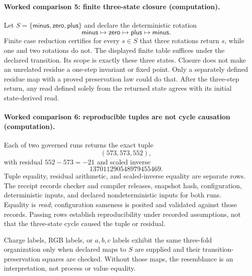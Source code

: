 \paragraph{Worked comparison 5: finite three-state closure (computation).}
Let \(S=\{\mathsf{minus},\mathsf{zero},\mathsf{plus}\}\) and declare the deterministic rotation
\[
\mathsf{minus}\mapsto\mathsf{zero}\mapsto\mathsf{plus}\mapsto\mathsf{minus}.
\]
Finite case reduction certifies for every \(s\in S\) that three rotations return \(s\), while one and two rotations do
not.  The displayed finite table suffices under the declared transition.  Its scope is exactly these three states.
Closure does not make an unrelated residue a one-step
invariant or fixed point.  Only a separately defined residue map with a proved preservation law could do that.
After the three-step return, any read defined solely from the returned state agrees with its initial state-derived
read.

\paragraph{Worked comparison 6: reproducible tuples are not cycle causation (computation).}
Each of two governed runs returns the exact tuple
\[
                         (573,573,552),
\]
with residual \(552-573=-21\) and scaled inverse
\[
                         137011290548979455469.
\]
Tuple equality, residual arithmetic, and scaled-inverse equality are separate rows.  The receipt records checker and
compiler releases, snapshot hash, configuration, deterministic inputs, and declared nondeterministic inputs for both
runs.  Equality is \emph{read}; configuration sameness is posited and validated against those records.  Passing rows
establish reproducibility under recorded assumptions, not that the three-state cycle caused the tuple or residual.

Charge labels, RGB labels, or \(a,b,c\) labels exhibit the same three-fold organization only when declared maps to
\(S\) are supplied and their transition-preservation squares are checked.  Without those maps, the resemblance is an
interpretation, not process or value equality.


